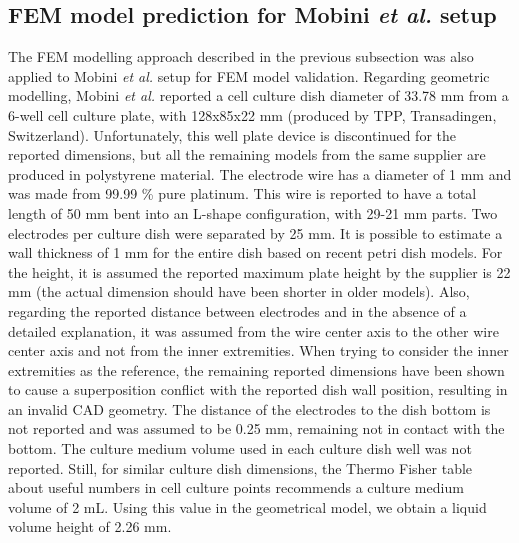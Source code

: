 \subsection{FEM model prediction for Mobini \textit{et al.} setup}
The FEM modelling approach described in the previous subsection was also applied to Mobini \textit{et al.} \cite{Mobini2016-jh} setup for \ac{FEM} model validation. Regarding geometric modelling, Mobini \textit{et al.} \cite{Mobini2016-jh} reported a cell culture dish diameter of \num{33.78} \si{\milli\meter} from a 6-well cell culture plate, with 128x85x22 \si{\milli\meter} (produced by TPP, Transadingen, Switzerland). Unfortunately, this well plate device is discontinued for the reported dimensions, but all the remaining models from the same supplier are produced in polystyrene material. The electrode wire has a diameter of 1 \si{\milli\meter} and was made from \num{99.99} \% pure platinum. This wire is reported to have a total length of 50 \si{\milli\meter} bent into an L-shape configuration, with 29-21 \si{\milli\meter} parts. Two electrodes per culture dish were separated by 25 \si{\milli\meter}. It is possible to estimate a wall thickness of 1 \si{\milli\meter} for the entire dish based on recent petri dish models. For the height, it is assumed the reported maximum plate height by the supplier is 22 \si{\milli\meter} (the actual dimension should have been shorter in older models). Also, regarding the reported distance between electrodes and in the absence of a detailed explanation, it was assumed from the wire center axis to the other wire center axis and not from the inner extremities. When trying to consider the inner extremities as the reference, the remaining reported dimensions have been shown to cause a superposition conflict with the reported dish wall position, resulting in an invalid CAD geometry. The distance of the electrodes to the dish bottom is not reported and was assumed to be \num{0.25} \si{\milli\meter}, remaining not in contact with the bottom. The culture medium volume used in each culture dish well was not reported. Still, for similar culture dish dimensions, the Thermo Fisher table about useful numbers in cell culture points \cite{Thermo} recommends a culture medium volume of 2 \si{\milli\liter}. Using this value in the geometrical model, we obtain a liquid volume height of \num{2.26} \si{\milli\meter}. 

